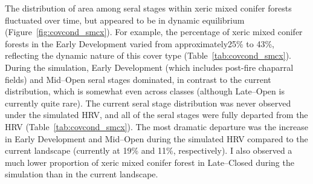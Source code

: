 The distribution of area among seral stages within xeric mixed conifer forests fluctuated over time, but appeared to be in dynamic equilibrium (Figure~\ref{fig:covcond_smcx}). For example, the percentage of xeric mixed conifer forests in the Early Development varied from approximately25\% to 43\%, reflecting the dynamic nature of this cover type (Table~\ref{tab:covcond_smcx}). During the simulation, Early Development (which includes post-fire chaparral fields) and Mid--Open seral stages dominated, in contrast to the current distribution, which is somewhat even across classes (although Late--Open is currently quite rare).
%
The current seral stage distribution was never observed under the simulated HRV, and all of the seral stages were fully departed from the HRV (Table~\ref{tab:covcond_smcx}). The most dramatic departure was the increase in Early Development and Mid--Open during the simulated HRV compared to the current landscape (currently at 19\% and 11\%, respectively). I also observed a much lower proportion of xeric mixed conifer forest in Late--Closed during the simulation than in the current landscape. 

